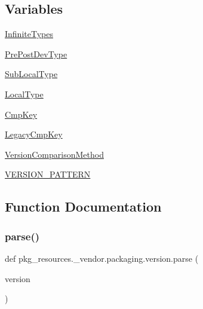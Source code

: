 \subsection*{Variables}
\begin{DoxyCompactItemize}
\item 
\hyperlink{namespacepkg__resources_1_1__vendor_1_1packaging_1_1version_a3ca517f84d9324451a6cae69a3d0294f}{Infinite\+Types}
\item 
\hyperlink{namespacepkg__resources_1_1__vendor_1_1packaging_1_1version_aeb8a4ea09a26d8ff0bbf2dee44e8828b}{Pre\+Post\+Dev\+Type}
\item 
\hyperlink{namespacepkg__resources_1_1__vendor_1_1packaging_1_1version_a9d1104c9f7d289255240c32746b41598}{Sub\+Local\+Type}
\item 
\hyperlink{namespacepkg__resources_1_1__vendor_1_1packaging_1_1version_aeff1fb1658978022a94fa72adc481532}{Local\+Type}
\item 
\hyperlink{namespacepkg__resources_1_1__vendor_1_1packaging_1_1version_a8f1f03132d3a9de3889c6cbd2c945749}{Cmp\+Key}
\item 
\hyperlink{namespacepkg__resources_1_1__vendor_1_1packaging_1_1version_ad5f46d1682bbbe9776606c67326ffbcc}{Legacy\+Cmp\+Key}
\item 
\hyperlink{namespacepkg__resources_1_1__vendor_1_1packaging_1_1version_a928b14f0c1951325bff305f29781c047}{Version\+Comparison\+Method}
\item 
\hyperlink{namespacepkg__resources_1_1__vendor_1_1packaging_1_1version_a30371f63a22d98321a9421643f1aeea6}{V\+E\+R\+S\+I\+O\+N\+\_\+\+P\+A\+T\+T\+E\+RN}
\end{DoxyCompactItemize}


\subsection{Function Documentation}
\mbox{\label{namespacepkg__resources_1_1__vendor_1_1packaging_1_1version_a478a09ba4a7b4fe5ac102489cfd64a19}} 
\subsubsection{\texorpdfstring{parse()}{parse()}}
{\footnotesize\ttfamily def pkg\+\_\+resources.\+\_\+vendor.\+packaging.\+version.\+parse (\begin{DoxyParamCaption}\item[{}]{version }\end{DoxyParamCaption})}

